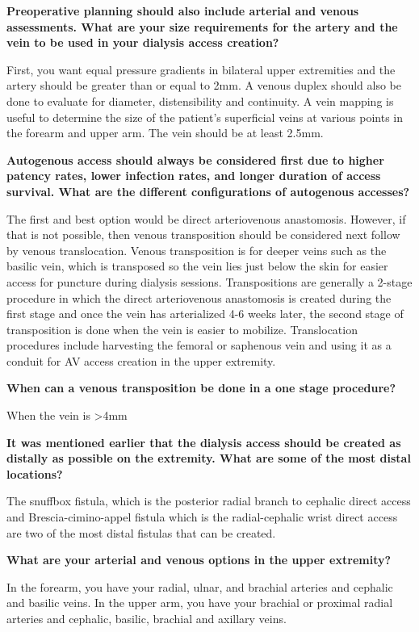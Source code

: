 \documentclass[
]{book}
\begin{document}
\textbf{Preoperative planning should also include arterial and venous
assessments. What are your size requirements for the artery and the vein
to be used in your dialysis access creation?}

First, you want equal pressure gradients in bilateral upper extremities
and the artery should be greater than or equal to 2mm. A venous duplex
should also be done to evaluate for diameter, distensibility and
continuity. A vein mapping is useful to determine the size of the
patient's superficial veins at various points in the forearm and upper
arm. The vein should be at least 2.5mm.

\textbf{Autogenous access should always be considered first due to higher
patency rates, lower infection rates, and longer duration of access
survival. What are the different configurations of autogenous
accesses?}

The first and best option would be direct arteriovenous anastomosis.
However, if that is not possible, then venous transposition should be
considered next follow by venous translocation. Venous transposition is
for deeper veins such as the basilic vein, which is transposed so the
vein lies just below the skin for easier access for puncture during
dialysis sessions. Transpositions are generally a 2-stage procedure in
which the direct arteriovenous anastomosis is created during the first
stage and once the vein has arterialized 4-6 weeks later, the second
stage of transposition is done when the vein is easier to mobilize.
Translocation procedures include harvesting the femoral or saphenous
vein and using it as a conduit for AV access creation in the upper
extremity.

\textbf{When can a venous transposition be done in a one stage procedure?}

When the vein is \textgreater4mm

\textbf{It was mentioned earlier that the dialysis access should be created as
distally as possible on the extremity. What are some of the most distal
locations?}

The snuffbox fistula, which is the posterior radial branch to cephalic
direct access and Brescia-cimino-appel fistula which is the
radial-cephalic wrist direct access are two of the most distal fistulas
that can be created.

\textbf{What are your arterial and venous options in the upper extremity?}

In the forearm, you have your radial, ulnar, and brachial arteries and
cephalic and basilic veins. In the upper arm, you have your brachial or
proximal radial arteries and cephalic, basilic, brachial and axillary
veins.
\end{document}
